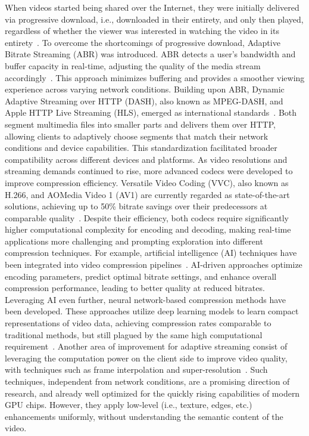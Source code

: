 \documentclass[sigconf, screen, review, anonymous]{acmart}
\begin{document}
When videos started being shared over the Internet, they were initially delivered via progressive download, i.e., downloaded in their entirety, and only then played, regardless of whether the viewer was interested in watching the video in its entirety~\cite{progressive}.
To overcome the shortcomings of progressive download, Adaptive Bitrate Streaming (ABR) was introduced. ABR detects a user’s bandwidth and buffer capacity in real-time, adjusting the quality of the media stream accordingly~\cite{ABR from Daniele? A survey paper?}. This approach minimizes buffering and provides a smoother viewing experience across varying network conditions.
Building upon ABR, Dynamic Adaptive Streaming over HTTP (DASH), also known as MPEG-DASH, and Apple HTTP Live Streaming (HLS), emerged as international standards~\cite{dash, hls}. Both segment multimedia files into smaller parts and delivers them over HTTP, allowing clients to adaptively choose segments that match their network conditions and device capabilities. This standardization facilitated broader compatibility across different devices and platforms.
As video resolutions and streaming demands continued to rise, more advanced codecs were developed to improve compression efficiency. Versatile Video Coding (VVC), also known as H.266, and AOMedia Video 1 (AV1) are currently regarded as state-of-the-art solutions, achieving up to 50\% bitrate savings over their predecessors at comparable quality~\cite{vvc, av1}. Despite their efficiency, both codecs require significantly higher computational complexity for encoding and decoding, making real-time applications more challenging and prompting exploration into different compression techniques. For example, artificial intelligence (AI) techniques have been integrated into video compression pipelines~\cite{ML for encoding, from Mohammad?}. AI-driven approaches optimize encoding parameters, predict optimal bitrate settings, and enhance overall compression performance, leading to better quality at reduced bitrates.
Leveraging AI even further, neural network-based compression methods have been developed. These approaches utilize deep learning models to learn compact representations of video data, achieving compression rates comparable to traditional methods, but still plagued by the same high computational requirement~\cite{some NeRV version from YiYing?}.
Another area of improvement for adaptive streaming consist of leveraging the computation power on the client side to improve video quality, with techniques such as frame interpolation and super-resolution~\cite{super resolution, frame interpolation, SRFI}. Such techniques, independent from network conditions, are a promising direction of research, and already well optimized for the quickly rising capabilities of modern GPU chips. However, they apply low-level (i.e., texture, edges, etc.) enhancements uniformly, without understanding the semantic content of the video.
\end{document}
